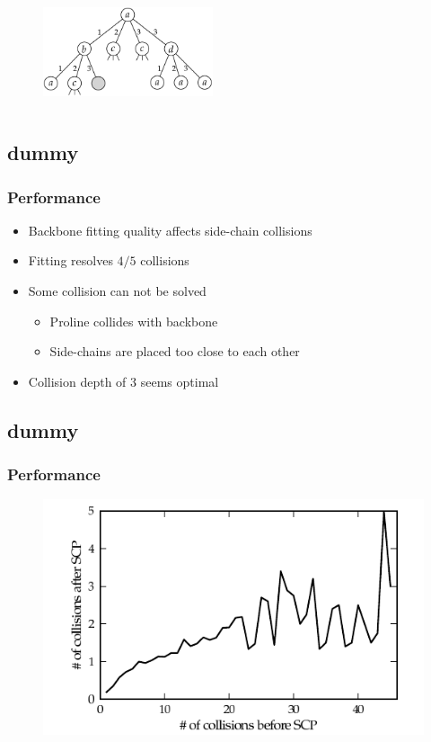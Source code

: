 \documentclass{beamer}
\begin{document}
\begin{frame}
\begin{columns}[c]
	
	\column{5cm}
	\begin{figure}
		\includegraphics[width=5cm]{../rapport/figures/rotamersearch.pdf}
	\end{figure}
	
	\end{columns}
\end{frame}

\subsection{dummy}
\begin{frame}
	\frametitle{Performance}
	
	\begin{itemize}
		\item Backbone fitting quality affects side-chain collisions
		\item Fitting resolves $4/5$ collisions
		\item Some collision can not be solved
		\begin{itemize}
			\item Proline collides with backbone
			\item Side-chains are placed too close to each other
		\end{itemize}
		\item Collision depth of 3 seems optimal
	\end{itemize}
	
\end{frame}

\subsection{dummy}
\begin{frame}
	\frametitle{Performance}
	
	\begin{figure}
		\centering
		\includegraphics[width=.75\columnwidth]{../rapport/figures/plot_scp}
	\end{figure}
	
\end{frame}
\end{document}
